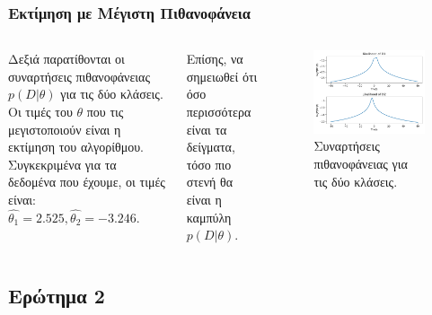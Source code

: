 \documentclass{beamer}
\begin{document}
\begin{frame}
\frametitle{Εκτίμηση με Μέγιστη Πιθανοφάνεια}

\begin{columns}

    
    Δεξιά παρατίθονται οι συναρτήσεις πιθανοφάνειας $p(D|\theta)$ για τις 
    δύο κλάσεις. Οι τιμές του $\theta$ που τις μεγιστοποιούν είναι η εκτίμηση
    του αλγορίθμου. Συγκεκριμένα για τα δεδομένα που έχουμε, οι τιμές είναι:
    $\hat{\theta_1} = 2.525, \hat{\theta_2} = -3.246$.

    Επίσης, να σημειωθεί ότι όσο περισσότερα είναι τα δείγματα, τόσο πιο 
    στενή θα είναι η καμπύλη $p(D|\theta)$.



    \begin{figure}
        \centering
            \includegraphics[width=\textwidth]{../plots/likelihoods.pdf}
            \caption{Συναρτήσεις πιθανοφάνειας για τις δύο κλάσεις.}
            \label{fig:likelihoods}
    \end{figure}


\end{columns}


    

\end{frame}

\subsection{Ερώτημα 2}
\end{document}
